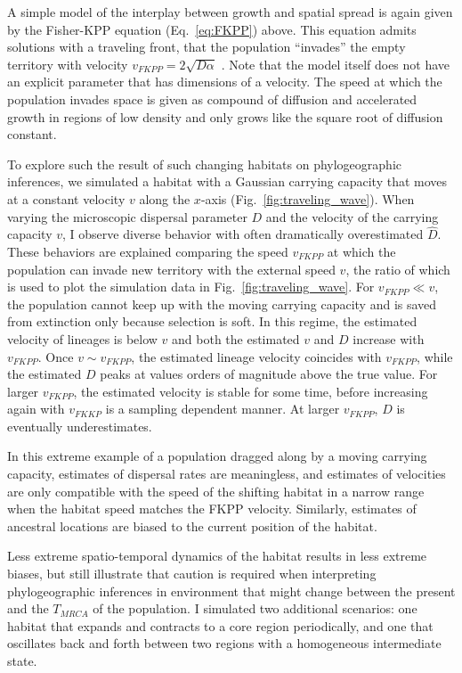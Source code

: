 \documentclass[aps,rmp, twocolumn]{revtex4}
\begin{document}
A simple model of the interplay between growth and spatial spread is again given by the Fisher-KPP equation (Eq.~\ref{eq:FKPP}) above. 
This equation admits solutions with a traveling front, that the population ``invades'' the empty territory with velocity $v_{FKPP} = 2\sqrt{D \alpha}$ \citep{fisher_wave_1937,KPP1937,hallatschek_life_2010}.
Note that the model itself does not have an explicit parameter that has dimensions of a velocity.
The speed at which the population invades space is given as compound of diffusion and accelerated growth in regions of low density and only grows like the square root of diffusion constant.

To explore such the result of such changing habitats on phylogeographic inferences, we simulated a habitat with a Gaussian carrying capacity that moves at a constant velocity $v$ along the $x$-axis (Fig.~\ref{fig:traveling_wave}). 
When varying the microscopic dispersal parameter $D$ and the velocity of the carrying capacity $v$, I observe diverse behavior with often dramatically overestimated $\hat{D}$. These behaviors are explained comparing the speed $v_{FKPP}$ at which the population can invade new territory with the external speed $v$, the ratio of which is used to plot the simulation data in Fig.~\ref{fig:traveling_wave}. 
For $v_{FKPP} \ll v$, the population cannot keep up with the moving carrying capacity and is saved from extinction only because selection is soft.
In this regime, the estimated velocity of lineages is below $v$ and both the estimated $v$ and $D$ increase with $v_{FKPP}$. 
Once $v\sim v_{FKPP}$, the estimated lineage velocity coincides with $v_{FKPP}$, while the estimated $D$ peaks at values orders of magnitude above the true value. 
For larger $v_{FKPP}$, the estimated velocity is stable for some time, before increasing again with $v_{FKKP}$ is a sampling dependent manner. 
At larger $v_{FKPP}$, $D$ is eventually underestimates.

In this extreme example of a population dragged along by a moving carrying capacity, estimates of dispersal rates are meaningless, and estimates of velocities are only compatible with the speed of the shifting habitat in a narrow range when the habitat speed matches the FKPP velocity.
Similarly, estimates of ancestral locations are biased to the current position of the habitat. 

Less extreme spatio-temporal dynamics of the habitat results in less extreme biases, but still illustrate that caution is required when interpreting phylogeographic inferences in environment that might change between the present and the $T_{MRCA}$ of the population.  
I simulated two additional scenarios: one habitat that expands and contracts to a core region periodically, and one that oscillates back and forth between two regions with a homogeneous intermediate state.
\end{document}
